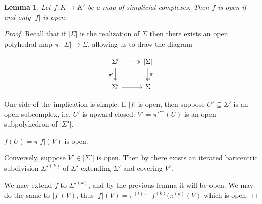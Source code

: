 \documentclass[12pt]{article}
\newtheorem{lemma}[theorem]{Lemma}
\numberwithin{equation}{subsection}
\begin{document}
\begin{lemma}
	Let $f:K\to K'$ be a map of simplicial complexes.
	Then $f$ is open if and only $|f|$ is open.
\end{lemma}
\begin{proof}
	Recall that if $|\Sigma|$ is the realization of $\Sigma$ then there exists an open polyhedral map $\pi:|\Sigma|\to \Sigma$, allowing us to draw the diagram
	
	 \[\begin{tikzcd}[ampersand replacement=\&]
	{|\Sigma'|} \& {|\Sigma|} \\
	{\Sigma'} \& \Sigma
	\arrow[dashed, two heads, from=1-1, to=1-2]
	\arrow["{\pi'}"', two heads, from=1-1, to=2-1]
	\arrow["\pi", two heads, from=1-2, to=2-2]
	\arrow[from=2-1, to=2-2]
\end{tikzcd}\]
	
	One side of the implication is simple: If $|f|$ is open, then suppose $U'\subseteq \Sigma'$ is an open subcomplex, i.e. $U'$ is upward-closed. $V'=\pi'^\gets(U)$ is an open subpolyhedron of $|\Sigma'|$.
	
	$f(U)=\pi|f|(V)$ is open.
	
	Conversely, suppose $V'\in |\Sigma'|$ is open.
	Then by \cite{dekker} there exists an iterated baricentric subdivision $\Sigma'^{(k)}$ of $\Sigma'$ extending $\Sigma'$ and covering $V'$.
	
	We may extend $f$ to $\Sigma'^{(k)}$, and by the previous lemma it will be open.
	We may do the same to $|f|(V)$, thus $|f|(V)=\pi^{(l)\gets}f^{(k)}(\pi^{(k)}(V)$ which is open.
\end{proof}
\end{document}
